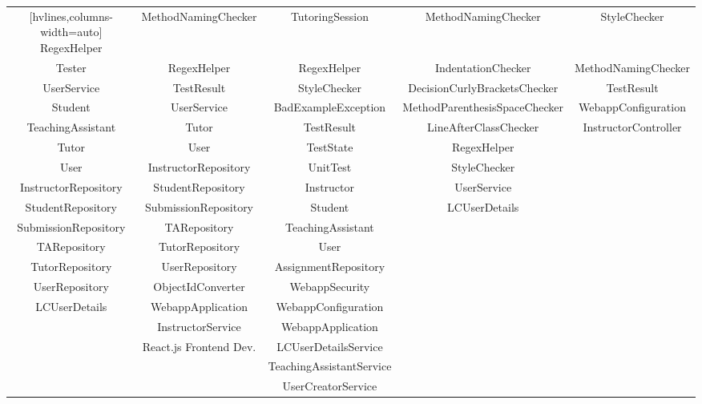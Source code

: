 \documentclass[a4paper, 12pt]{article}
\begin{document}
\begin{table}[ht]
{\begin{NiceTabular}{ccccc}[hvlines,columns-width=auto]
            RegexHelper & MethodNamingChecker & TutoringSession & MethodNamingChecker & StyleChecker \\

            Tester & RegexHelper & RegexHelper & IndentationChecker & MethodNamingChecker \\

            UserService & TestResult & StyleChecker & DecisionCurlyBracketsChecker & TestResult \\

            Student & UserService & BadExampleException & MethodParenthesisSpaceChecker & WebappConfiguration \\

            TeachingAssistant & Tutor & TestResult & LineAfterClassChecker & InstructorController \\

            Tutor & User & TestState & RegexHelper &  \\

            User & InstructorRepository & UnitTest & StyleChecker &  \\

            InstructorRepository & StudentRepository & Instructor & UserService &  \\

            StudentRepository & SubmissionRepository & Student & LCUserDetails &  \\

            SubmissionRepository & TARepository & TeachingAssistant &  &  \\

            TARepository & TutorRepository & User &  &  \\

            TutorRepository & UserRepository & AssignmentRepository &  &  \\

            UserRepository & ObjectIdConverter & WebappSecurity &  &  \\

            LCUserDetails & WebappApplication & WebappConfiguration &  &  \\

             & InstructorService & WebappApplication &  &  \\

             & React.js Frontend Dev. & LCUserDetailsService &  &  \\

             &  & TeachingAssistantService &  &  \\

             &  & UserCreatorService &  &  \\

            \end{NiceTabular} }

    \end{table}
\end{document}
